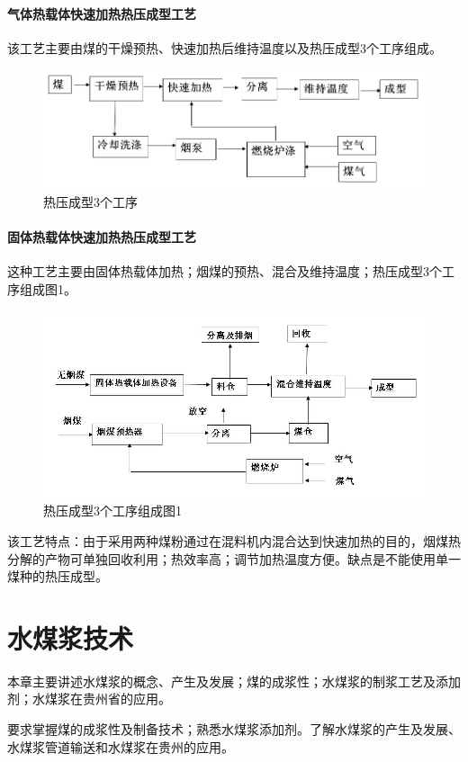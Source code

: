 \documentclass[10pt,openany]{ctexbook}
\begin{document}
 \subsubsection{气体热载体快速加热热压成型工艺}
 该工艺主要由煤的干燥预热、快速加热后维持温度以及热压成型3个工序组成。
    \begin{figure}[!ht]
\includegraphics[scale=0.6]{28}
\caption{热压成型3个工序}
\end{figure}
\subsubsection{固体热载体快速加热热压成型工艺}
这种工艺主要由固体热载体加热；烟煤的预热、混合及维持温度；热压成型3个工序组成图1。

    \begin{figure}[!t]
\includegraphics[scale=0.6]{29}
\caption{热压成型3个工序组成图1}
\end{figure}
该工艺特点：由于采用两种煤粉通过在混料机内混合达到快速加热的目的，烟煤热分解的产物可单独回收利用；热效率高；调节加热温度方便。缺点是不能使用单一煤种的热压成型。
\chapter{水煤浆技术}
本章主要讲述水煤浆的概念、产生及发展；煤的成浆性；水煤浆的制浆工艺及添加剂；水煤浆在贵州省的应用。\par
要求掌握煤的成浆性及制备技术；熟悉水煤浆添加剂。了解水煤浆的产生及发展、水煤浆管道输送和水煤浆在贵州的应用。
\end{document}
